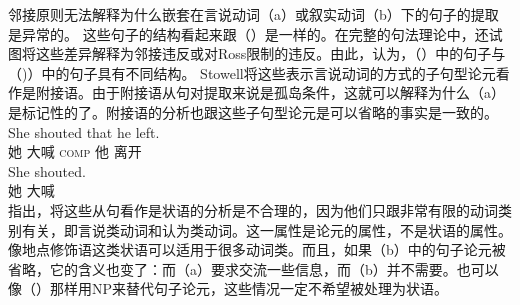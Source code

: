 邻接原则无法解释为什么嵌套在言说动词（a）或叙实动词（b）下的句子的提取是异常的\citep[--69]{EL79a}。
\eal
{}
\zl
这些句子的结构看起来跟（）是一样的。在完整的句法理论中，还试图将这些差异解释为邻接违反或对Ross限制的违反。由此，\citep[--402]{Stowell81a-u}认为，（）中的句子与（)）中的句子具有不同结构。
Stowell将这些表示言说动词的方式的子句型论元看作是附接语。由于附接语从句对提取来说是孤岛条件，这就可以解释为什么（a）是标记性的了。附接语的分析也跟这些子句型论元是可以省略的事实是一致的。
\eal
\ex 
\gll She shouted that he left.\\
她 大喊 \textsc{comp} 他 离开\\
\ex 
\gll She shouted.\\
她 大喊\\
\zl
 \citet[]{AG2008a}指出，将这些从句看作是状语的分析是不合理的，因为他们只跟非常有限的动词类别有关，即言说类动词和认为类动词。这一属性是论元的属性，不是状语的属性。像地点修饰语这类状语可以适用于很多动词类。而且，如果（b）中的句子论元被省略，它的含义也变了：而（a）要求交流一些信息，而（b）并不需要。也可以像（）那样用NP来替代句子论元，这些情况一定不希望被处理为状语。
